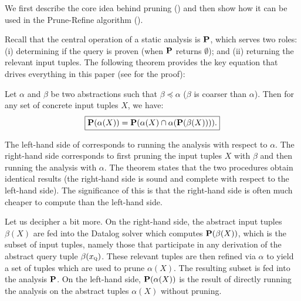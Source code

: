 
We first describe the core
idea behind pruning () and then show how it can be used in the
Prune-Refine algorithm ().


Recall that the central operation of a static analysis is $\mathbf{P}$, which serves two roles: (i)
determining if the query is proven (when $\mathbf{P}$ returns $\emptyset$); and (ii)
returning the relevant input tuples.
The following theorem provides the key equation that drives everything in this paper (see  for the proof):

\begin{theorem}
\label{thm:master}
Let $\alpha$ and $\beta$ be two abstractions such that $\beta \preceq \alpha$
($\beta$ is coarser than $\alpha$).
Then for any set of concrete input tuples $X$, we have:
\begin{align}
\label{eqn:master}
\boxed{
\mathbf{P}(\alpha(X)) = \mathbf{P}(\alpha(X) \cap \alpha(\mathbf{P}(\beta(X)))).
}
\end{align}
\end{theorem}

The left-hand side of  corresponds to running the analysis with respect to $\alpha$.
The right-hand side corresponds to first pruning the input tuples $X$
with $\beta$ and then running the analysis with $\alpha$.
The theorem states that the two procedures obtain identical results
(the right-hand side is sound and complete with respect to the left-hand side).
The significance of this is that the right-hand side is often much cheaper
to compute than the left-hand side.

Let us decipher  a bit more.
On the right-hand side,
the abstract input tuples $\beta(X)$
are fed into the Datalog solver which computes $\mathbf{P}(\beta(X))$,
which is the subset of input tuples, namely those that participate in any derivation of the abstract query tuple $\beta(x_\text{\sc q})$.
These relevant tuples are then refined via $\alpha$ to yield a set of tuples which are used to prune $\alpha(X)$.
The resulting subset is fed into the analysis $\mathbf{P}$.
On the left-hand side, $\mathbf{P}(\alpha(X))$ is the result of directly running the analysis
on the abstract tuples $\alpha(X)$ without pruning.

